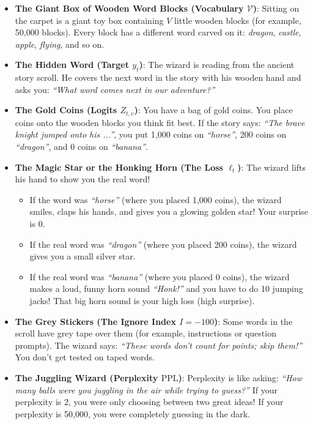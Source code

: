 \documentclass[11pt,a4paper]{article}
\theoremstyle{definition}
\begin{document}
\begin{itemize}
    \item \textbf{The Giant Box of Wooden Word Blocks (Vocabulary $\mathcal{V}$)}:
    Sitting on the carpet is a giant toy box containing $V$ little wooden blocks (for example, 50,000 blocks). Every block has a different word carved on it: \emph{dragon}, \emph{castle}, \emph{apple}, \emph{flying}, and so on.
    
    \item \textbf{The Hidden Word (Target $y_t$)}:
    The wizard is reading from the ancient story scroll. He covers the next word in the story with his wooden hand and asks you: \emph{``What word comes next in our adventure?''}
    
    \item \textbf{The Gold Coins (Logits $Z_{t, v}$)}:
    You have a bag of gold coins. You place coins onto the wooden blocks you think fit best. If the story says: \emph{``The brave knight jumped onto his ...''}, you put 1,000 coins on \emph{``horse''}, 200 coins on \emph{``dragon''}, and 0 coins on \emph{``banana''}.
    
    \item \textbf{The Magic Star or the Honking Horn (The Loss $\ell_t$)}:
    The wizard lifts his hand to show you the real word!
    \begin{itemize}
        \item If the word was \emph{``horse''} (where you placed 1,000 coins), the wizard smiles, claps his hands, and gives you a glowing golden star! Your surprise is 0.
        \item If the real word was \emph{``dragon''} (where you placed 200 coins), the wizard gives you a small silver star.
        \item If the real word was \emph{``banana''} (where you placed 0 coins), the wizard makes a loud, funny horn sound \emph{``Honk!''} and you have to do 10 jumping jacks! That big horn sound is your high loss (high surprise).
    \end{itemize}
    
    \item \textbf{The Grey Stickers (The Ignore Index $I = -100$)}:
    Some words in the scroll have grey tape over them (for example, instructions or question prompts). The wizard says: \emph{``These words don't count for points; skip them!''} You don't get tested on taped words.
    
    \item \textbf{The Juggling Wizard (Perplexity $\text{PPL}$)}:
    Perplexity is like asking: \emph{``How many balls were you juggling in the air while trying to guess?''} If your perplexity is 2, you were only choosing between two great ideas! If your perplexity is 50,000, you were completely guessing in the dark.
\end{itemize}
\end{document}
